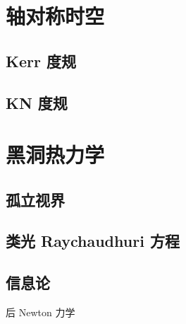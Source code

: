 \section{轴对称时空}
    \subsection{Kerr 度规}
    \subsection{KN 度规}

\section{黑洞热力学}
\subsection{孤立视界}
\subsection{类光 Raychaudhuri 方程}
\subsection{信息论}


后 Newton 力学
